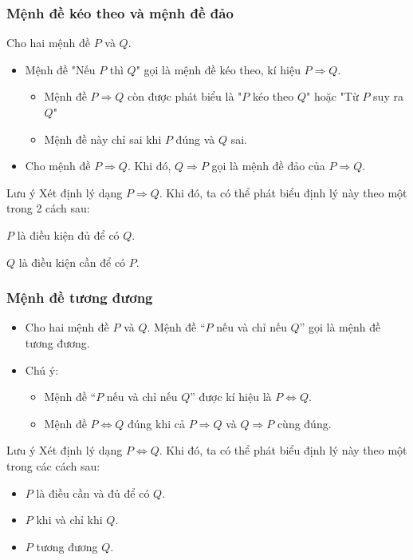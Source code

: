 \subsubsection{Mệnh đề kéo theo và mệnh đề đảo}
	Cho hai mệnh đề $P$ và $Q$.
		\begin{itemize}
			\item[\iconMT]  Mệnh đề "Nếu $P$ thì $Q$" gọi là mệnh đề kéo theo, kí hiệu  $P\Rightarrow Q$.
				\begin{boxkn}
			\begin{itemize}
				\item  Mệnh đề $P\Rightarrow Q$ còn được phát biểu là "$P$ kéo theo $Q$" hoặc "Từ $P$ suy ra $Q$"
				\item  Mệnh đề này chỉ sai khi $P$ đúng và $Q$ sai.
			\end{itemize}
				\end{boxkn}
				\item[\iconMT]  Cho mệnh đề $P\Rightarrow Q$. Khi đó, $Q\Rightarrow P$ gọi là mệnh đề đảo của $P\Rightarrow Q$.
		\end{itemize}
	\begin{khung4}{Lưu ý}
		Xét định lý dạng $P\Rightarrow Q$. Khi đó, ta có thể phát biểu định lý này theo một trong 2 cách sau:
		\begin{listEX}[2]
			\item[\ding{172}] $P$ là điều kiện đủ để có $Q$.
			\item[\ding{173}] $Q$ là điều kiện cần để có $P$.
		\end{listEX}
	\end{khung4}
\subsubsection{Mệnh đề tương đương}
\begin{itemize}
	\item [\iconMT] Cho hai mệnh đề $P$ và $Q$. Mệnh đề ``$P$ nếu và chỉ nếu $Q$''  gọi là  mệnh đề tương đương.
	\item [\iconMT] Chú ý:
	\begin{boxkn}
	\begin{itemize}
		\item  Mệnh đề ``$P$ nếu và chỉ nếu $Q$'' được kí hiệu là $P\Leftrightarrow Q$.
		\item 	Mệnh đề $P\Leftrightarrow Q$ đúng khi cả $P\Rightarrow Q$ và $Q\Rightarrow P$ cùng đúng.
	\end{itemize}
	\end{boxkn}
\end{itemize}
			\begin{khung4}{Lưu ý}
				Xét định lý dạng $P \Leftrightarrow Q$. Khi đó, ta có thể phát biểu định lý này theo một trong các cách sau:
				\begin{itemize}
					\item[\ding{172}] $P$ là điều cần và đủ để có $Q$.
					\item[\ding{173}] $P$ khi và chỉ khi $Q$.
					\item[\ding{174}] $P$ tương đương $Q$.
				\end{itemize}
			\end{khung4}
